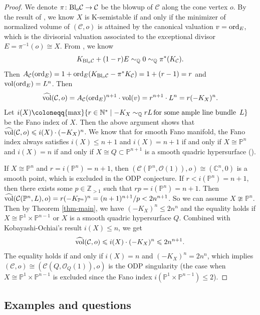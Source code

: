 \documentclass[12pt]{amsart}
\newcommand{\hvol}{{\widehat{\rm vol}}}
\theoremstyle{definition}
\def\ord{{\rm ord}}
\def\max{{\rm max}}
\def\bl{{\rm Bl}}
\def\vol{{\rm vol}}
\def\ord{{\rm ord}}
\newcommand{\IC}{{\mathbb C}}
\newcommand{\IN}{{\mathbb N}}
\newcommand{\IP}{{\mathbb P}}
\newcommand{\IQ}{{\mathbb Q}}
\newcommand{\IZ}{{\mathbb Z}}
\newcommand{\CC}{{\mathcal C}}
\newcommand{\CO}{{\mathcal O}}
\newcommand{\lee}{\leqslant}
\begin{document}
\begin{proof}
    We denote $\pi\colon\bl_o \CC \rightarrow \CC$ be the blowup of $\CC$ along the cone vertex $o$. By the result of \cite{Li17,LL19}, we know $X$ is K-semistable if and only if the minimizer of normalized volume of $(\CC,o)$ is attained by the canonical valuation $v=\ord_E$, which is the divisorial valuation associated to the exceptional divisor $E=\pi^{-1}(o)\cong X$. From \cite[Section 3.1]{Kol13}, we know 
    \begin{eqnarray*}
        K_{\bl_o \CC}+(1-r)E\sim_{\IQ}0\sim_{\IQ}\pi^*(K_{\CC}).
    \end{eqnarray*}
    Then $A_{\CC}(\ord_E)=1+\ord_E(K_{\bl_o \CC}-\pi^{*}K_{\CC})=1+(r-1)=r$ and  $\vol(\ord_E)=L^n$. Then 
    $$
    \hvol(\CC,o)=A_{\CC}(\ord_E)^{n+1}\cdot \vol(v)=r^{n+1}\cdot L^n=r(-K_X)^n.
    $$
    Let $i(X)\coloneqq \max\{r\in \IN^*\mid -K_X\sim_{\IQ}rL\,\text{for some ample line bundle }\, L\}$ be the Fano index of $X$. Then the above argument shows that $\hvol(\CC,o)\lee i(X)\cdot (-K_X)^n$. We know that for smooth Fano manifold, the Fano index always satisfies $i(X)\lee n+1$ and $i(X)=n+1$ if and only if $X\cong \IP^n$ and $i(X)=n$ if and only if $X\cong Q\subset \IP^{n+1}$ is a smooth quadric hypersurface (\cite{KO73}). 
    
    If $X\cong \IP^n$ and $r=i(\IP^n)=n+1$, then $(\CC(\IP^n,\CO(1)),o)\cong (\IC^n,0)$ is a smooth point, which is excluded in the ODP conjecture. If $r<i(\IP^n)=n+1$, then there exists some $p\in \IZ_{>1}$ such that $rp=i(\IP^n)=n+1$. Then $\hvol(\CC(\IP^n,L),o)=r(-K_{\IP^n})^n=(n+1)^{n+1}/p<2n^{n+1}$. So we can assume $X\ncong \IP^n$. Then by Theorem \ref{thm-main}, we have $(-K_X)^{n}\lee 2n^n$ and the equality holds if $X\cong \IP^1\times \IP^{n-1}$ or $X$ is a smooth quadric hypersurface $Q$. Combined with Kobayashi-Ochiai's result $i(X)\lee n$, we get 
    \begin{eqnarray*}
        \hvol(\CC,o)\lee i(X)\cdot(-K_X)^n\lee 2n^{n+1}.
    \end{eqnarray*}
    The equality holds if and only if $i(X)=n$ and $(-K_X)^n=2n^n$, which implies $(\CC,o)\cong (\CC(Q,\CO_Q(1)),o)$ is the ODP singularity (the case when $X\cong \IP^1\times \IP^{n-1}$ is excluded since the Fano index $i(\IP^1\times \IP^{n-1})\leq 2$).
\end{proof}

\subsection{Examples and questions}
\end{document}

